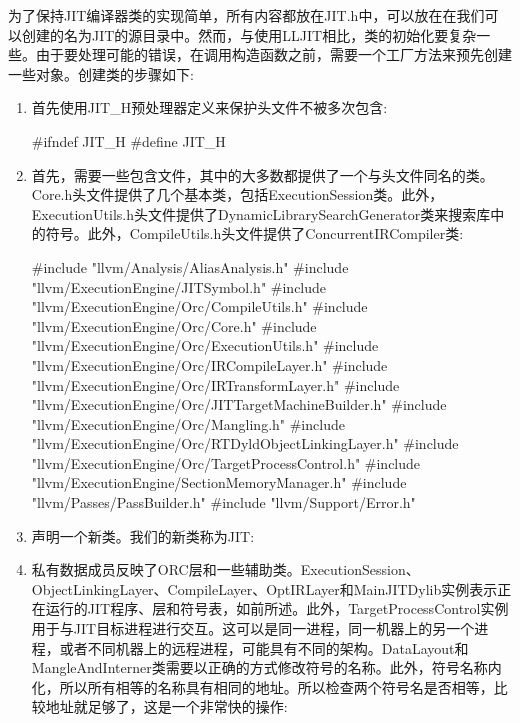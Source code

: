 为了保持JIT编译器类的实现简单，所有内容都放在JIT.h中，可以放在在我们可以创建的名为JIT的源目录中。然而，与使用LLJIT相比，类的初始化要复杂一些。由于要处理可能的错误，在调用构造函数之前，需要一个工厂方法来预先创建一些对象。创建类的步骤如下:

\begin{enumerate}
\item
首先使用JIT\_H预处理器定义来保护头文件不被多次包含:

\begin{cpp}
#ifndef JIT_H
#define JIT_H
\end{cpp}

\item
首先，需要一些包含文件，其中的大多数都提供了一个与头文件同名的类。Core.h头文件提供了几个基本类，包括ExecutionSession类。此外，ExecutionUtils.h头文件提供了DynamicLibrarySearchGenerator类来搜索库中的符号。此外，CompileUtils.h头文件提供了ConcurrentIRCompiler类:

\begin{cpp}
#include "llvm/Analysis/AliasAnalysis.h"
#include "llvm/ExecutionEngine/JITSymbol.h"
#include "llvm/ExecutionEngine/Orc/CompileUtils.h"
#include "llvm/ExecutionEngine/Orc/Core.h"
#include "llvm/ExecutionEngine/Orc/ExecutionUtils.h"
#include "llvm/ExecutionEngine/Orc/IRCompileLayer.h"
#include "llvm/ExecutionEngine/Orc/IRTransformLayer.h"
#include "llvm/ExecutionEngine/Orc/JITTargetMachineBuilder.h"
#include "llvm/ExecutionEngine/Orc/Mangling.h"
#include "llvm/ExecutionEngine/Orc/RTDyldObjectLinkingLayer.h"
#include "llvm/ExecutionEngine/Orc/TargetProcessControl.h"
#include "llvm/ExecutionEngine/SectionMemoryManager.h"
#include "llvm/Passes/PassBuilder.h"
#include "llvm/Support/Error.h"
\end{cpp}

\item
声明一个新类。我们的新类称为JIT:

\begin{cpp}
class JIT {
\end{cpp}

\item
私有数据成员反映了ORC层和一些辅助类。ExecutionSession、ObjectLinkingLayer、CompileLayer、OptIRLayer和MainJITDylib实例表示正在运行的JIT程序、层和符号表，如前所述。此外，TargetProcessControl实例用于与JIT目标进程进行交互。这可以是同一进程，同一机器上的另一个进程，或者不同机器上的远程进程，可能具有不同的架构。DataLayout和MangleAndInterner类需要以正确的方式修改符号的名称。此外，符号名称内化，所以所有相等的名称具有相同的地址。所以检查两个符号名是否相等，比较地址就足够了，这是一个非常快的操作:


\end{enumerate}
